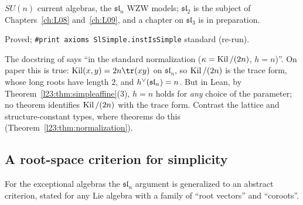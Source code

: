 \begin{physics}
$SU(n)$ current algebras, the $\mathfrak{sl}_n$ WZW models; $\mathfrak{sl}_2$ is the subject of
Chapters~\ref{ch:L08} and~\ref{ch:L09}, and a chapter on $\mathfrak{sl}_3$ is in preparation.
\end{physics}

\begin{status}
Proved; \texttt{\#print axioms SlSimple.instIsSimple} standard (re-run).
\end{status}

\begin{warning}[title={Trap: The normalization of \texttt{slAffineVOA} is not proved standard}]\label{l23:warn:slnnorm}
The docstring of  says ``in the standard normalization ($\kappa=\operatorname{Kil}/(2n)$, $h=n$)''. On paper this is true:
$\lxxiiiKil(x,y)=2n\tr(xy)$ on $\mathfrak{sl}_n$, so $\operatorname{Kil}/(2n)$ is the trace form, whose long roots have length $2$, and
$h^\vee(\mathfrak{sl}_n)=n$. But in Lean, by Theorem~\ref{l23:thm:simpleaffine}(3), $h=n$ holds for \emph{any} choice of the
parameter; no theorem identifies $\operatorname{Kil}/(2n)$ with the trace form. Contrast the lattice and structure-constant types, where
 theorems do this (Theorem~\ref{l23:thm:normalization}).
\end{warning}

\subsection{A root-space criterion for simplicity}

For the exceptional algebras the $\mathfrak{sl}_n$ argument is generalized to an abstract criterion, stated for any Lie algebra with
a family of ``root vectors'' and ``coroots''.


